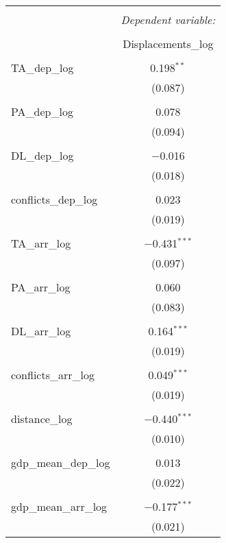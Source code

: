 
\begin{table}[!htbp] \centering 
  \caption{} 
  \label{} 
\begin{tabular}{@{\extracolsep{5pt}}lc} 
\\[-1.8ex]\hline 
\hline \\[-1.8ex] 
 & \multicolumn{1}{c}{\textit{Dependent variable:}} \\ 
\cline{2-2} 
\\[-1.8ex] & Displacements\_log \\ 
\hline \\[-1.8ex] 
 TA\_dep\_log & 0.198$^{**}$ \\ 
  & (0.087) \\ 
  & \\ 
 PA\_dep\_log & 0.078 \\ 
  & (0.094) \\ 
  & \\ 
 DL\_dep\_log & $-$0.016 \\ 
  & (0.018) \\ 
  & \\ 
 conflicts\_dep\_log & 0.023 \\ 
  & (0.019) \\ 
  & \\ 
 TA\_arr\_log & $-$0.431$^{***}$ \\ 
  & (0.097) \\ 
  & \\ 
 PA\_arr\_log & 0.060 \\ 
  & (0.083) \\ 
  & \\ 
 DL\_arr\_log & 0.164$^{***}$ \\ 
  & (0.019) \\ 
  & \\ 
 conflicts\_arr\_log & 0.049$^{***}$ \\ 
  & (0.019) \\ 
  & \\ 
 distance\_log & $-$0.440$^{***}$ \\ 
  & (0.010) \\ 
  & \\ 
 gdp\_mean\_dep\_log & 0.013 \\ 
  & (0.022) \\ 
  & \\ 
 gdp\_mean\_arr\_log & $-$0.177$^{***}$ \\ 
  & (0.021) \\ 

\end{tabular}
\end{table}
